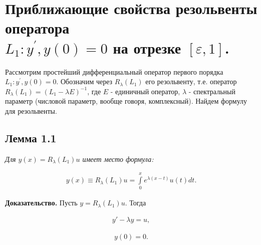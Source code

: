  


\renewcommand{\rmdefault}{cmr} %
\renewcommand{\sfdefault}{cmss} %
\renewcommand{\ttdefault}{cmtt} %



%

\tableofcontents

\abbrevdef
\intro
\chapter{Приближающие свойства резольвенты оператора \\ $ L_1:y^{'}, y(0)=0 $ на отрезке $ [\varepsilon, 1] $.}
Рассмотрим простейший дифференциальный оператор первого порядка $ L_1:y^{'}, y(0)=0 $. Обозначим через $ R_\lambda(L_1) $ его резольвенту, т.е. оператор $ R_\lambda(L_1)=(L_1-\lambda E)^{-1} $, где $ E $ - единичный оператор, $ \lambda $ - спектральный параметр (числовой параметр,  вообще говоря, комплексный). Найдем формулу для резольвенты.

\section{Лемма 1.1}
\label{lemma1.1}

\textit{Для $ y(x) = R_\lambda(L_1)u$ имеет место формула:}

\begin{equation}
\begin{array}{c}

y(x) \equiv R_\lambda(L_1)u = \int\limits_0^x e^{\lambda(x-t)}u(t)dt.

\end{array}
\end{equation}

\textbf{Доказательство.} Пусть $ y = R_\lambda(L_1)u$. Тогда

\begin{equation}
\begin{array}{c}

y'- \lambda y = u,

\end{array}
\end{equation}

\begin{equation}
\begin{array}{c}

y(0)=0.

\end{array}
\end{equation}

